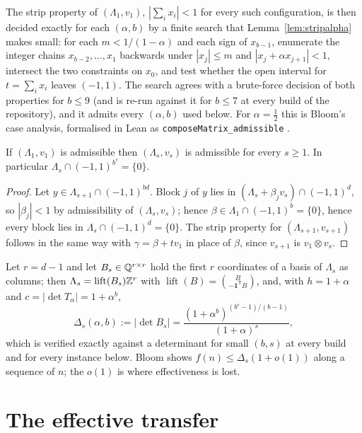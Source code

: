 \documentclass[11pt]{article}
\newcommand{\lift}{\operatorname{lift}}
\begin{document}
The strip property of $(\Lambda_1,v_1)$, $|\sum_ix_i|<1$ for every such configuration, is then decided exactly for each $(\alpha,b)$ by a finite search that Lemma~\ref{lem:stripalpha} makes small: for each $m<1/(1-\alpha)$ and each sign of $x_{b-1}$, enumerate the integer chains $x_{b-2},\dots,x_1$ backwards under $|x_j|\le m$ and $|x_j+\alpha x_{j+1}|<1$, intersect the two constraints on $x_0$, and test whether the open interval for $t=\sum_ix_i$ leaves $(-1,1)$. The search agrees with a brute-force decision of both properties for $b\le9$ (and is re-run against it for $b\le7$ at every build of the repository), and it admits every $(\alpha,b)$ used below. For $\alpha=\tfrac12$ this is Bloom's case analysis, formalised in Lean as \texttt{composeMatrix\_admissible} \cite{Erdos1repo}.

\begin{lemma}\label{lem:cube}
If $(\Lambda_1,v_1)$ is admissible then $(\Lambda_s,v_s)$ is admissible for every $s\ge1$. In particular $\Lambda_s\cap(-1,1)^{b^s}=\{0\}$.
\end{lemma}

\begin{proof}
Let $y\in\Lambda_{s+1}\cap(-1,1)^{bd}$. Block $j$ of $y$ lies in
$(\Lambda_s+\beta_jv_s)\cap(-1,1)^d$, so $|\beta_j|<1$ by admissibility of $(\Lambda_s,v_s)$;
hence $\beta\in\Lambda_1\cap(-1,1)^b=\{0\}$, hence every block lies in
$\Lambda_s\cap(-1,1)^d=\{0\}$. The strip property for $(\Lambda_{s+1},v_{s+1})$ follows in the
same way with $\gamma=\beta+tv_1$ in place of $\beta$, since $v_{s+1}$ is $v_1\otimes v_s$.
\end{proof}

Let $r=d-1$ and let $B_s\in\mathbb{Q}^{r\times r}$ hold the first $r$ coordinates of a basis of
$\Lambda_s$ as columns; then $\Lambda_s=\lift(B_s)\Z^r$ with
$\lift(B)=\binom{B}{-\mathbf 1^{\mathsf T}B}$, and, with $h=1+\alpha$ and $c=|\det T_\alpha|=1+\alpha^b$,
\begin{equation}\label{eq:delta}
\Delta_s(\alpha,b):=|\det B_s|=\frac{(1+\alpha^b)^{(b^s-1)/(b-1)}}{(1+\alpha)^s},
\end{equation}
which is verified exactly against a determinant for small $(b,s)$ at every build and for every instance below. Bloom shows
$f(n)\le\Delta_s(1+o(1))$ along a sequence of $n$; the $o(1)$ is where effectiveness is lost.

\section{The effective transfer}
\end{document}
